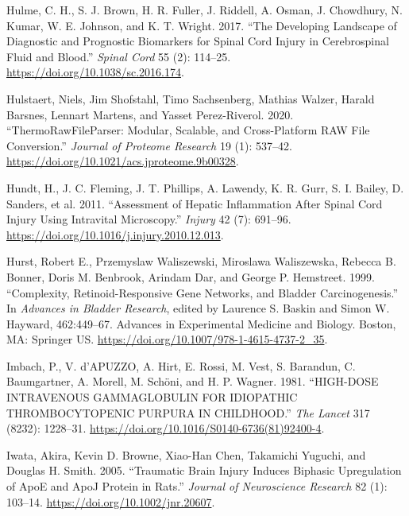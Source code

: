 \documentclass[9pt,lineno]{elife}
\newlength{\cslhangindent}
\newlength{\cslentryspacingunit} %
\newenvironment{CSLReferences}[2] %
 {%
  \setlength{\parindent}{0pt}
  \ifodd #1
  \let\oldpar\par
  \def\par{\hangindent=\cslhangindent\oldpar}
  \fi
  \setlength{\parskip}{#2\cslentryspacingunit}
 }%
 {}
\begin{document}
\begin{CSLReferences}{1}{0}
\leavevmode{}%
Hulme, C. H., S. J. Brown, H. R. Fuller, J. Riddell, A. Osman, J. Chowdhury, N. Kumar, W. E. Johnson, and K. T. Wright. 2017. {``The Developing Landscape of Diagnostic and Prognostic Biomarkers for Spinal Cord Injury in Cerebrospinal Fluid and Blood.''} \emph{Spinal Cord} 55 (2): 114--25. \url{https://doi.org/10.1038/sc.2016.174}.

\leavevmode{}%
Hulstaert, Niels, Jim Shofstahl, Timo Sachsenberg, Mathias Walzer, Harald Barsnes, Lennart Martens, and Yasset Perez-Riverol. 2020. {``{ThermoRawFileParser}: {Modular}, {Scalable}, and {Cross-Platform RAW File Conversion}.''} \emph{Journal of Proteome Research} 19 (1): 537--42. \url{https://doi.org/10.1021/acs.jproteome.9b00328}.

\leavevmode{}%
Hundt, H., J. C. Fleming, J. T. Phillips, A. Lawendy, K. R. Gurr, S. I. Bailey, D. Sanders, et al. 2011. {``Assessment of Hepatic Inflammation After Spinal Cord Injury Using Intravital Microscopy.''} \emph{Injury} 42 (7): 691--96. \url{https://doi.org/10.1016/j.injury.2010.12.013}.

\leavevmode{}%
Hurst, Robert E., Przemyslaw Waliszewski, Miroslawa Waliszewska, Rebecca B. Bonner, Doris M. Benbrook, Arindam Dar, and George P. Hemstreet. 1999. {``Complexity, {Retinoid-Responsive Gene Networks}, and {Bladder Carcinogenesis}.''} In \emph{Advances in {Bladder Research}}, edited by Laurence S. Baskin and Simon W. Hayward, 462:449--67. Advances in {Experimental Medicine} and {Biology}. {Boston, MA}: {Springer US}. \url{https://doi.org/10.1007/978-1-4615-4737-2_35}.

\leavevmode{}%
Imbach, P., V. d'APUZZO, A. Hirt, E. Rossi, M. Vest, S. Barandun, C. Baumgartner, A. Morell, M. Schöni, and H. P. Wagner. 1981. {``{HIGH-DOSE INTRAVENOUS GAMMAGLOBULIN FOR IDIOPATHIC THROMBOCYTOPENIC PURPURA IN CHILDHOOD}.''} \emph{The Lancet} 317 (8232): 1228--31. \url{https://doi.org/10.1016/S0140-6736(81)92400-4}.

\leavevmode{}%
Iwata, Akira, Kevin D. Browne, Xiao-Han Chen, Takamichi Yuguchi, and Douglas H. Smith. 2005. {``Traumatic Brain Injury Induces Biphasic Upregulation of {ApoE} and {ApoJ} Protein in Rats.''} \emph{Journal of Neuroscience Research} 82 (1): 103--14. \url{https://doi.org/10.1002/jnr.20607}.


\end{CSLReferences}
\end{document}
